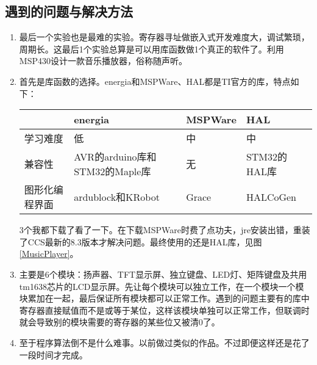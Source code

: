 \subsection{遇到的问题与解决方法}
\begin{enumerate}
	\item 最后一个实验也是最难的实验。寄存器寻址做嵌入式开发难度大，调试繁琐，周期长。这最后1个实验总算是可以用库函数做1个真正的软件了。利用MSP430设计一款音乐播放器，俗称随声听。
	\item 首先是库函数的选择。energia和MSPWare、HAL都是TI官方的库，特点如下：
	\begin{table}[htbp]
		\centering
		\caption{MSP430库函数}
		\label{MSP430库函数}
			\begin{longtabu}to\toprule
			&energia&MSPWare&HAL\\\midrule
			学习难度&低&中&中\\
			兼容性&AVR的arduino库和STM32的Maple库&无&STM32的HAL库\\
			图形化编程界面&ardublock和KRobot&Grace&HALCoGen\\\bottomrule
			\end{longtabu}
	\end{table}
	\par\indent 3个我都下载了看了一下。在下载MSPWare时费了点功夫，jre安装出错，重装了CCS最新的8.3版本才解决问题。最终使用的还是HAL库，见图\ref{MusicPlayer}。
	\item 主要是6个模块：扬声器、TFT显示屏、独立键盘、LED灯、矩阵键盘及共用tm1638芯片的LCD显示屏。先让每个模块可以独立工作，在一个模块一个模块累加在一起，最后保证所有模块都可以正常工作。遇到的问题主要有的库中寄存器直接赋值而不是或等于某位，这样该模块单独可以正常工作，但联调时就会导致别的模块需要的寄存器的某些位又被清0了。
	\item 至于程序算法倒不是什么难事。以前做过类似的作品。不过即便这样还是花了一段时间才完成。
\end{enumerate}
